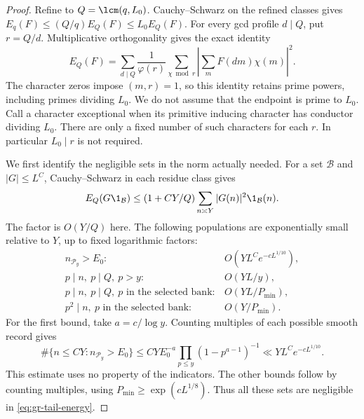 \begin{proof}
Refine to \(Q=\lcm(q,L_0)\).
Cauchy--Schwarz on the refined classes gives
\(E_q(F)\le(Q/q)E_Q(F)\le L_0E_Q(F)\).
For every gcd profile \(d\mid Q\), put \(r=Q/d\).
Multiplicative orthogonality gives the exact identity
\begin{equation}
 E_Q(F)=\sum_{d\mid Q}\frac1{\varphi(r)}
       \sum_{\chi\bmod r}\left|\sum_m F(dm)\chi(m)\right|^2.
 \label{eq:gr-gcdidentity}
\end{equation}
The character zeros impose \((m,r)=1\), so this identity retains
prime powers, including primes dividing \(L_0\). We do not assume
that the endpoint is prime to \(L_0\). Call a character exceptional
when its primitive inducing character has conductor dividing \(L_0\).
There are only a fixed number of such characters for each \(r\).
In particular \(L_0\mid r\) is not required.

We first identify the negligible sets in the norm actually needed.
For a set \(\mathcal B\) and \(|G|\le L^C\), Cauchy--Schwarz in each
residue class gives
\begin{equation}
 E_Q(G\1_{\mathcal B})
 \le(1+CY/Q)\sum_{n\asymp Y}|G(n)|^2\1_{\mathcal B}(n).
 \label{eq:gr-tail-energy}
\end{equation}
The factor is \(O(Y/Q)\) here.
The following populations are exponentially small relative to \(Y\),
up to fixed logarithmic factors:
\begin{equation}
 \begin{array}{ll}
 n_{\mathcal P_y}>E_0:& O(YL^C e^{-cL^{1/10}}),\\
 p\mid n,\ p\mid Q,\ p>y:& O(YL/y),\\
 p\mid n,\ p\mid Q,\ p\text{ in the selected bank}:&
                  O(YL/P_{\min}),\\
 p^2\mid n,\ p\text{ in the selected bank}:&
                  O(Y/P_{\min}).
 \end{array}                                                       \label{eq:gr-tailsets}
\end{equation}
For the first bound, take \(a=c/\log y\). Counting multiples of
each possible smooth record gives
\[
 \#\{n\le CY:n_{\mathcal P_y}>E_0\}
 \le CY E_0^{-a}\prod_{p\le y}(1-p^{a-1})^{-1}
                 \ll YL^C e^{-cL^{1/10}}.
\]
This estimate uses no property of the indicators. The other bounds
follow by counting multiples,
using \(P_{\min}\ge\exp(cL^{1/8})\).
Thus all these sets are negligible in \eqref{eq:gr-tail-energy}.


\end{proof}
